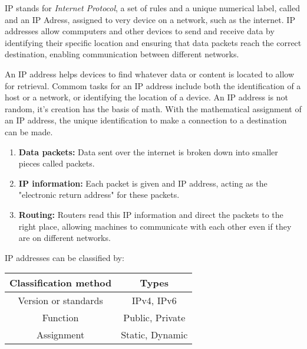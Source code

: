IP stands for \emph{Internet Protocol}, a set of rules and a unique numerical label, called and an IP Adress, assigned to very device on a network, such as the internet. IP addresses allow commputers and other devices to send and receive data by identifying their specific location and ensuring that data packets reach the correct destination, enabling communication between different networks.

An IP address helps devices to find whatever data or content is located to allow for retrieval. Commom tasks for an IP address include both the identification of a host or a network, or identifying the location of a device. An IP address is not random, it's creation has the basis of math. With the mathematical assignment of an IP address, the unique identification to make a connection to a destination can be made.

\begin{enumerate}
  \item \textbf{Data packets:} Data sent over the internet is broken down into smaller pieces called packets.
  \item \textbf{IP information:} Each packet is given and IP address, acting as the "electronic return address" for these packets.
  \item \textbf{Routing:} Routers read this IP information and direct the packets to the right place, allowing machines to communicate with each other even if they are on different networks.
\end{enumerate}

IP addresses can be classified by:

\begin{table}[H]
  \centering
  \begin{tabular}{|c|c|}
    \hline
    \textbf{Classification method} & \textbf{Types} \\
    \hline
    Version or standards & IPv4, IPv6 \\
    \hline
    Function & Public, Private \\
    \hline
    Assignment & Static, Dynamic \\
    \hline
  \end{tabular}
\end{table}
